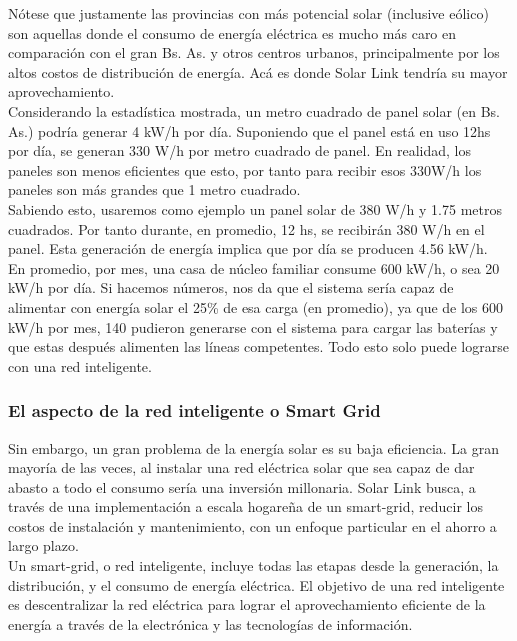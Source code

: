 Nótese que justamente las provincias con más potencial solar (inclusive eólico) son aquellas donde el consumo de energía eléctrica es mucho más caro en comparación con el gran Bs. As. y otros centros urbanos, principalmente por los altos costos de distribución de energía. Acá es donde Solar Link tendría su mayor aprovechamiento.\\

Considerando la estadística mostrada, un metro cuadrado de panel solar (en Bs. As.) podría generar 4 kW/h por día. Suponiendo que el panel está en uso 12hs por día, se generan 330 W/h por metro cuadrado de panel. 
En realidad, los paneles son menos eficientes que esto, por tanto para recibir esos 330W/h los paneles son más grandes que 1 metro cuadrado. \\

Sabiendo esto, usaremos como ejemplo un panel solar de 380 W/h y 1.75 metros cuadrados. Por tanto durante, en promedio, 12 hs, se recibirán 380 W/h en el panel. Esta generación de energía implica que por día se producen 4.56 kW/h.\\

En promedio, por mes, una casa de núcleo familiar consume 600 kW/h, o sea 20 kW/h por día. Si hacemos números, nos da que el sistema sería capaz de alimentar con energía solar el 25\% de esa carga (en promedio), ya que de los 600 kW/h por mes, 140 pudieron generarse con el sistema para cargar las baterías y que estas después alimenten las líneas competentes. 
Todo esto solo puede lograrse con una red inteligente.\\

\subsubsection{El aspecto de la red inteligente o Smart Grid}
Sin embargo, un gran problema de la energía solar es su baja eficiencia. La gran mayoría de las veces, al instalar una red eléctrica solar que sea capaz de dar abasto a todo el consumo sería una inversión millonaria. Solar Link busca, a través de una implementación a escala hogareña de un smart-grid, reducir los costos de instalación y mantenimiento, con un enfoque particular en el ahorro a largo plazo.\\

Un smart-grid, o red inteligente, incluye todas las etapas desde la generación, la distribución, y el consumo de energía eléctrica. El objetivo de una red inteligente es descentralizar la red eléctrica para lograr el aprovechamiento eficiente de la energía a través de la electrónica y las tecnologías de información.

